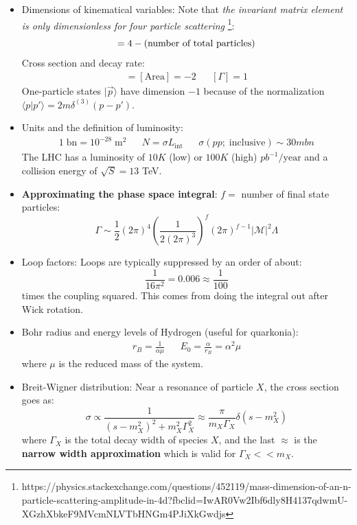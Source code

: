 \documentclass[11pt, oneside]{article}   	%
\theoremstyle{definition}
\numberwithin{equation}{subsection}		%
\begin{document}
\begin{itemize}
	\item Dimensions of kinematical variables: Note that \textit{the invariant matrix element is only dimensionless for four particle scattering}
	\footnote{https://physics.stackexchange.com/questions/452119/mass-dimension-of-an-n-particle-scattering-amplitude-in-4d?fbclid=IwAR0Vw2Ibf6dly8H4137qdwmU-XGzhXbkeF9MVcmNLVTbHNGm4PJiXkGwdjs}:
	\begin{equation}
		[\mathcal M] = 4 - (\textnormal{number of total particles})
	\end{equation}
	Cross section and decay rate:
	\begin{align}
		[\sigma] = [\mathrm{Area}] = -2 && [\Gamma] = 1
	\end{align}
	One-particle states $|\vec p\rangle$ have dimension $-1$ because of the normalization $\langle p | p'\rangle = 2 m \delta^{(3)}(p - p')$. 
	
	\item Units and the definition of luminosity:
	\begin{align}
		1\;\mathrm{bn} = 10^{-28} \;\mathrm{m}^2 && N = \sigma L_\mathrm{int} && \sigma(pp; \;\mathrm{inclusive})\sim 30 mbn
	\end{align}
	The LHC has a luminosity of $10K$ (low) or $100K$ (high) $pb^{-1} / \mathrm{year}$ and a collision energy of $\sqrt S = 13$ TeV.
	
	\item \textbf{Approximating the phase space integral}: $f =$ number of final state particles:
	\begin{equation}
		\Gamma\sim \frac{1}{2}(2\pi)^4 \left(\frac{1}{2 (2\pi)^3}\right)^{f} (2\pi)^{f - 1} |\mathcal M|^2 \Lambda
	\end{equation}
	
	\item Loop factors: Loops are typically suppressed by an order of about:
	\begin{equation}
		\frac{1}{16\pi^2} = 0.006\approx \frac{1}{100}
	\end{equation}
	times the coupling squared. This comes from doing the integral out after Wick rotation.
	
	\item Bohr radius and energy levels of Hydrogen (useful for quarkonia):
	\begin{align}
		r_B = \frac{1}{\alpha \mu} && E_0 = \frac{\alpha}{r_B} = \alpha^2\mu
	\end{align}
	where $\mu$ is the reduced mass of the system. 
	
	\item Breit-Wigner distribution: Near a resonance of particle $X$, the cross section goes as:
	\begin{equation}
		\sigma \propto \frac{1}{(s - m_X^2)^2 + m_X^2 \Gamma_X^2}\approx \frac{\pi}{m_X\Gamma_X}\delta(s - m_X^2)
	\end{equation}
	where $\Gamma_X$ is the total decay width of species $X$, and the last $\approx$ is the \textbf{narrow width 
	approximation} which is valid for $\Gamma_X << m_X$. 
	

\end{itemize}
\end{document}
